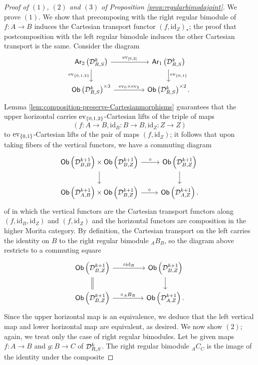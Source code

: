 \documentclass[10pt, reqno, twoside
, final
]{amsart}
\numberwithin{equation}{subsection}%
\theoremstyle{definition}
\theoremstyle{definition}
\theoremstyle{definition}
\theoremstyle{definition}
\theoremstyle{definition}
\theoremstyle{definition}
\theoremstyle{definition}
\theoremstyle{definition}
\theoremstyle{definition}
\theoremstyle{plain}
\theoremstyle{definition}
\theoremstyle{plain}
\theoremstyle{definition}
\theoremstyle{plain}
\theoremstyle{definition}
\theoremstyle{definition}
\theoremstyle{plain}
\theoremstyle{plain}
\theoremstyle{definition}
\theoremstyle{plain}
\theoremstyle{plain}
\theoremstyle{plain}
\begin{document}
\begin{proof}[Proof of $(1)$, $(2)$ and $(3)$ of Proposition \ref{prop:regularbimodajoint}]
We prove $(1)$. We show that precomposing with the right regular bimodule of $f:A\rightarrow B$ induces the Cartesian transport functor $(f,\mathrm{id}_Z)_*$; the proof that postcomposition with the left regular bimodule induces the other Cartesian transport is the same. Consider the diagram 
\[
\begin{tikzcd}
    \mathsf{Ar}_2\left(\icatd_{R,S}^k\right) \ar[r,"\ev_{[0,2]}"] \ar[d,"\ev_{\{0{,}1{,}2\}}"'] &[2em]\mathsf{Ar}_1\left(\icatd_{R,S}^k\right) \ar[d,"\ev_{\{0{,}1\}}"] \\
    \mathsf{Ob}\left(\icatd_{R,S}^k\right)^{\times 3}\ar[r,"\ev_0\times\ev_2"]&[2em]\mathsf{Ob}\left(\icatd_{R,S}^k\right)^{\times 2}. 
\end{tikzcd}
\]
Lemma \ref{lem:composition-preserve-Cartesianmorphisms} guarantees that the upper horizontal carries $\mathrm{ev}_{\{0,1,2\}}$-Cartesian lifts of the triple of maps 
\[(f:A\rightarrow B,\mathrm{id}_B:B\rightarrow B,\mathrm{id}_Z:Z\rightarrow Z)\]
to $\mathrm{ev}_{\{0,1\}}$-Cartesian lifts of the pair of maps $(f,\mathrm{id}_Z)$; it follows that upon taking fibers of the vertical functors, we have a commuting diagram
\[
\begin{tikzcd}
    \mathsf{Ob}\left(\icatd_{B,B}^{k+1}\right) \times  \mathsf{Ob}\left(\icatd_{B,Z}^{k+1}\right) \ar[r,"\circ"] \ar[d] &  \mathsf{Ob}\left(\icatd_{B,Z}^{k+1}\right)\ar[d] \\
      \mathsf{Ob}\left(\icatd_{A,B}^{k+1}\right)\times  \mathsf{Ob}\left(\icatd_{B,Z}^{k+1}\right) \ar[r,"\circ "]&  \mathsf{Ob}\left(\icatd_{A,Z}^{k+1}\right). 
\end{tikzcd}
\]
of \infcats in which the vertical functors are the Cartesian transport functors along $(f,\mathrm{id}_B,\mathrm{id}_Z)$ and $(f,\mathrm{id}_Z)$ and the horizontal functors are composition in the higher Morita category. By definition, the Cartesian transport on the left carries the identity on $B$ to the right regular bimodule ${}_AB_{B}$, so the diagram above restricts to a commuting square
\[
\begin{tikzcd}
 \mathsf{Ob}\left(\icatd_{B,Z}^{k+1}\right) \ar[r,"\circ \mathrm{id}_B"] \ar[d,equal] &[2em]  \mathsf{Ob}\left(\icatd_{B,Z}^{k+1}\right) \ar[d]\\ \mathsf{Ob}\left(\icatd_{B,Z}^{k+1}\right) \ar[r,"\circ {}_AB_{B}"]&[2em]  \mathsf{Ob}\left(\icatd_{A,Z}^{k+1}\right). 
\end{tikzcd}
\]
Since the upper horizontal map is an equivalence, we deduce that the left vertical map and lower horizontal map are equivalent, as desired. We now show $(2)$; again, we treat only the case of right regular bimodules. Let be given maps $f:A\rightarrow B$ and $g:B\rightarrow C$ of $\mathcal{D}^k_{R,S}$. The right regular bimodule ${}_AC_C$ is the image of the identity under the composite 

\end{proof}
\end{document}
